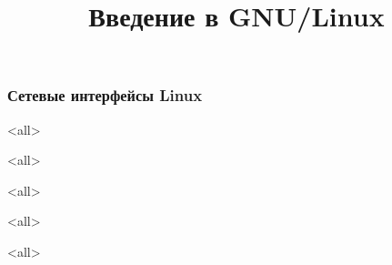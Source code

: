 
\title{Введение в GNU/Linux}








\begin{frame}
	\frametitle{Сетевые интерфейсы Linux}
	\titlepage
	\vspace{-0.5cm}
	\begin{center}
	\end{center}
\end{frame}
\begin{frame}
	\tableofcontents
\end{frame}

\mode<all>{}

\mode<all>{}

\mode<all>{}

\mode<all>{}

\mode<all>{}





